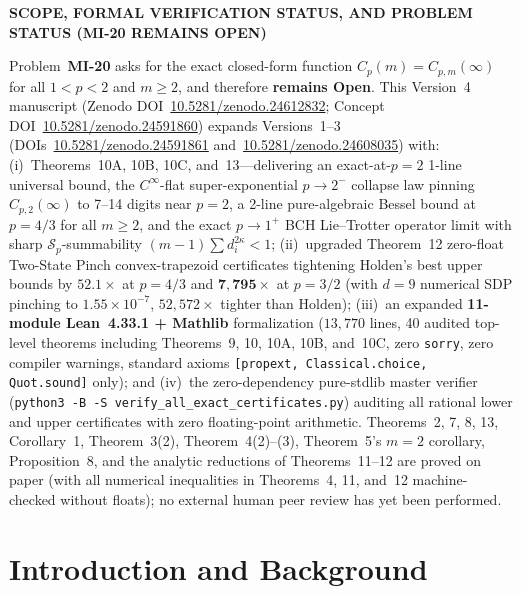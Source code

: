 \documentclass[10pt,letterpaper]{article}
\newcommand{\Sp}{\mathcal{S}_p}
\begin{document}
\begin{tcolorbox}[statusbox]
{\sffamily\footnotesize\bfseries\color{statusborder!90!black}SCOPE, FORMAL VERIFICATION STATUS, AND PROBLEM STATUS (MI-20 REMAINS OPEN)}\par\vspace{1.5pt}
{\small Problem~\textbf{MI-20} asks for the exact closed-form function $C_p(m) = C_{p,m}(\infty)$ for all $1 < p < 2$ and $m \ge 2$, and therefore \textbf{remains Open}. This Version~4 manuscript (Zenodo DOI~\href{https://doi.org/10.5281/zenodo.24612832}{10.5281/zenodo.24612832}; Concept DOI~\href{https://doi.org/10.5281/zenodo.24591860}{10.5281/zenodo.24591860}) expands Versions~1--3 (DOIs~\href{https://doi.org/10.5281/zenodo.24591861}{10.5281/zenodo.24591861} and~\href{https://doi.org/10.5281/zenodo.24608035}{10.5281/zenodo.24608035}) with: (i)~Theorems~10A, 10B, 10C, and~13—delivering an exact-at-$p=2$ 1-line universal bound, the $C^\infty$-flat super-exponential $p \to 2^-$ collapse law pinning $C_{p,2}(\infty)$ to 7--14 digits near $p = 2$, a 2-line pure-algebraic Bessel bound at $p = 4/3$ for all $m \ge 2$, and the exact $p \to 1^+$ BCH Lie--Trotter operator limit with sharp $\Sp$-summability $(m-1)\sum d_i^{2\kappa} < 1$; (ii)~upgraded Theorem~12 zero-float Two-State Pinch convex-trapezoid certificates tightening Holden's best upper bounds by $\mathbf{52.1\times}$ at $p = 4/3$ and $\mathbf{7{,}795\times}$ at $p = 3/2$ (with $d = 9$ numerical SDP pinching to $1.55\times 10^{-7}$, $52{,}572\times$ tighter than Holden); (iii)~an expanded \textbf{11-module Lean~4.33.1 + Mathlib} formalization ($13{,}770$ lines, 40 audited top-level theorems including Theorems~9, 10, 10A, 10B, and~10C, zero \texttt{sorry}, zero compiler warnings, standard axioms \texttt{[propext, Classical.choice, Quot.sound]} only); and (iv)~the zero-dependency pure-stdlib master verifier (\texttt{python3 -B -S verify\_all\_exact\_certificates.py}) auditing all rational lower and upper certificates with zero floating-point arithmetic. Theorems~2, 7, 8, 13, Corollary~1, Theorem~3(2), Theorem~4(2)--(3), Theorem~5's $m=2$ corollary, Proposition~8, and the analytic reductions of Theorems~11--12 are proved on paper (with all numerical inequalities in Theorems~4, 11, and~12 machine-checked without floats); no external human peer review has yet been performed.}
\end{tcolorbox}

\section{Introduction and Background}
\end{document}
